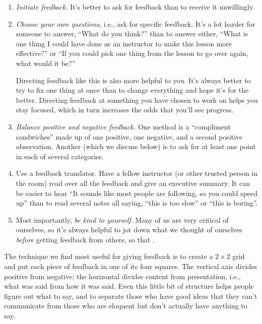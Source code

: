 \begin{enumerate}

\item
  \emph{Initiate feedback.} It's better to ask for feedback than to
  receive it unwillingly.

\item
  \emph{Choose your own questions}, i.e., ask for specific
  feedback. It's a lot harder for someone to answer, ``What do you
  think?'' than to answer either, ``What is one thing I could have
  done as an instructor to make this lesson more effective?''  or ``If
  you could pick one thing from the lesson to go over again, what
  would it be?''

  Directing feedback like this is also more helpful to you.  It's
  always better to try to fix one thing at once than to change
  everything and hope it's for the better.  Directing feedback at
  something you have chosen to work on helps you stay focused, which
  in turn increases the odds that you'll see progress.

\item
  \emph{Balance positive and negative feedback.}  One method is a
  ``compliment sandwiches'' made up of one positive, one negative, and
  a second positive observation.  Another (which we discuss below) is
  to ask for at least one point in each of several categories.

\item
  Use a feedback translator. Have a fellow instructor (or other
  trusted person in the room) read over all the feedback and give an
  executive summary. It can be easier to hear ``It sounds like most
  people are following, so you could speed up'' than to read several
  notes all saying, ``this is too slow'' or ``this is boring''.

\item
  Most importantly, \emph{be kind to yourself}.  Many of us are very
  critical of ourselves, so it's always helpful to jot down what we
  thought of ourselves \emph{before} getting feedback from others,
  so that .

\end{enumerate}

The technique we find most useful for giving feedback is to create a
$2{\times}2$ grid and put each piece of feedback in one of its four
squares.  The vertical axis divides positive from negative; the
horizontal divides content from presentation, i.e., what was said from
how it was said.  Even this little bit of structure helps people
figure out what to say, and to separate those who have good ideas that
they can't communicate from those who are eloquent but don't actually
have anything to say.


